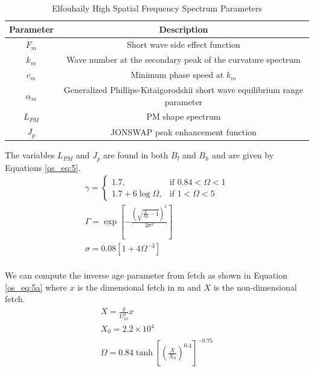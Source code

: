 \begin{table}[H]
  \begin{center}
      \renewcommand{\baselinestretch}{1} \small\normalsize
  \begin{quote}
    \caption[Elfouhaily High Spatial Frequency Spectrum Parameters]{Elfouhaily High Spatial Frequency Spectrum Parameters\label{os_tab:2}}
  \end{quote}
  \begin{tabular} {|c | c |}
    \hline
  \bf{Parameter} & \bf{Description} \\ \hline
  $F_m$ & Short wave side effect function \\ \hline
  $k_m$ &  Wave number at the secondary peak of the curvature spectrum \\ \hline
  $c_m$ &  Minimum phase speed at $k_m$ \\ \hline
  $\alpha_m$ & Generalized Phillips-Kitaigorodskii short wave equilibrium range parameter \\ \hline
  $L_{PM}$ & PM shape spectrum \\ \hline
  $J_p$ & JONSWAP peak enhancement function \\ \hline
\end{tabular}
\end{center}
\end{table}
\renewcommand{\baselinestretch}{2} \small\normalsize
The variables $L_{PM}$ and $J_p$ are found in both $B_l$ and $B_h$ and are given by Equations \ref{os_eq:5}.
\begin{equation}
\begin{gathered}
  \label{os_eq:5}
    \gamma = \begin{cases}
    1.7,& \text{if } 0.84 < \Omega < 1\\
    1.7 + 6\log{\Omega}, & \text{if } 1 < \Omega < 5
  \end{cases} \\
  \Gamma = \exp{\left[- \frac{\left(\sqrt{\frac{k}{kp} - 1} \right)^2}{2\sigma^2} \right]} \\
  \sigma = 0.08\left[1 + 4\Omega^{-3} \right] \\
\end{gathered}
\end{equation}
\renewcommand{\baselinestretch}{2} \small\normalsize

We can compute the inverse age parameter from fetch as shown in Equation \ref{os_eq:5a} where $x$ is the dimensional fetch in m and $X$ is the non-dimensional fetch.
\begin{equation}
\label{os_eq:5a}
\begin{gathered}
 X = \frac{g}{U_{10}^2}x\\
 X_0 = 2.2 \times 10^4 \\
 \Omega = 0.84\tanh\left[\left(\frac{X}{X_0} \right)^{0.4} \right]^{-0.75} \\
\end{gathered}
\end{equation}
\renewcommand{\baselinestretch}{2} \small\normalsize

